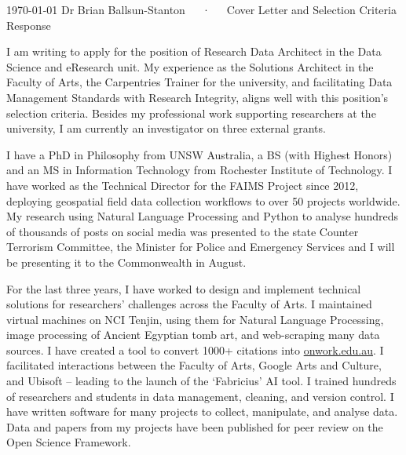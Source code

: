 \documentclass[11pt, a4paper]{awesome-cv}
\begin{document}
\makecvheader[C]

\makecvfooter
 {\today}
 {Dr Brian Ballsun-Stanton~~~·~~~Cover Letter and Selection Criteria Response}
 {\thepage}

\makelettertitle

\begin{cvletter}


I am writing to apply for the position of Research Data Architect in the Data Science and eResearch unit. My experience as the Solutions Architect in the Faculty of Arts, the Carpentries Trainer for the university, and facilitating Data Management Standards with Research Integrity, aligns well with this position's selection criteria. Besides my professional work supporting researchers at the university, I am currently an investigator on three external grants. 


I have a PhD in Philosophy from UNSW Australia, a BS (with Highest Honors) and an MS in Information Technology from Rochester Institute of Technology. I have worked as the Technical Director for the FAIMS Project since 2012, deploying geospatial field data collection workflows to over 50 projects worldwide. My research using Natural Language Processing and Python to analyse hundreds of thousands of posts on social media was presented to the state Counter Terrorism Committee, the Minister for Police and Emergency Services and I will be presenting it to the Commonwealth in August. 

For the last three years, I have worked to design and implement technical solutions for researchers' challenges across the Faculty of Arts. I maintained virtual machines on NCI Tenjin, using them for Natural Language Processing, image processing of Ancient Egyptian tomb art, and web-scraping many data sources. I have created a tool to convert 1000+ citations into \href{https://onwork.edu.au}{onwork.edu.au}. I facilitated interactions between the Faculty of Arts, Google Arts and Culture, and Ubisoft -- leading to the launch of the `Fabricius' AI tool. I trained hundreds of researchers and students in data management, cleaning, and version control. I have written software for many projects to collect, manipulate, and analyse data. Data and papers from my projects have been published for peer review on the Open Science Framework. 



\end{cvletter}
\end{document}
